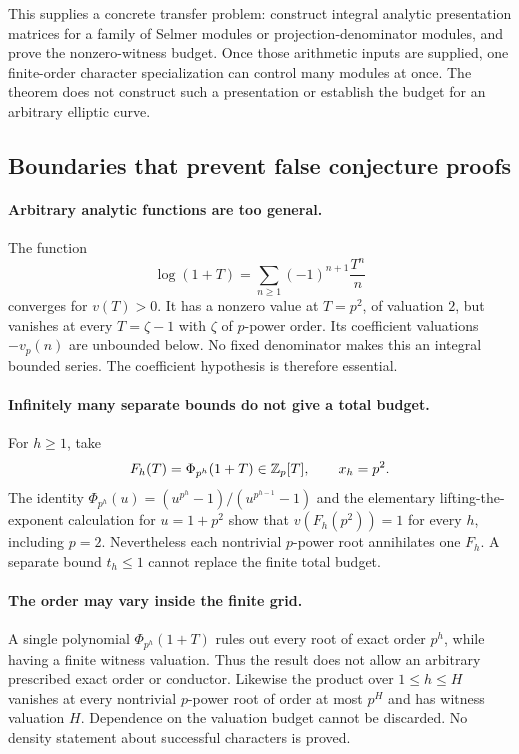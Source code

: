 This supplies a concrete transfer problem: construct integral analytic
presentation matrices for a family of Selmer modules or
projection-denominator modules, and prove the nonzero-witness budget.
Once those arithmetic inputs are supplied, one finite-order character
specialization can control many modules at once. The theorem does not
construct such a presentation or establish the budget for an arbitrary
elliptic curve.

\subsection{Boundaries that prevent false conjecture proofs}

\paragraph{Arbitrary analytic functions are too general.}
The function
\[
 \log(1+T)=\sum_{n\ge1}(-1)^{n+1}\frac{T^n}{n}
\]
converges for $v(T)>0$. It has a nonzero value at $T=p^2$, of
valuation $2$, but vanishes at every $T=\zeta-1$ with $\zeta$ of
$p$-power order. Its coefficient valuations $-v_p(n)$ are unbounded
below. No fixed denominator makes this an integral bounded series.
The coefficient hypothesis is therefore essential.

\paragraph{Infinitely many separate bounds do not give a total budget.}
For $h\ge1$, take
\[
 F_h(T)=\Phi_{p^h}(1+T)\in\mathbb Z_p[T],\qquad x_h=p^2.
\]
The identity
$\Phi_{p^h}(u)=(u^{p^h}-1)/(u^{p^{h-1}}-1)$ and the elementary
lifting-the-exponent calculation for $u=1+p^2$ show that
$v(F_h(p^2))=1$ for every $h$, including $p=2$.
Nevertheless each nontrivial $p$-power root annihilates one $F_h$.
A separate bound $t_h\le1$ cannot replace the finite total budget.

\paragraph{The order may vary inside the finite grid.}
A single polynomial $\Phi_{p^h}(1+T)$ rules out every root of exact
order $p^h$, while having a finite witness valuation. Thus the result
does not allow an arbitrary prescribed exact order or conductor.
Likewise the product over $1\le h\le H$ vanishes at every nontrivial
$p$-power root of order at most $p^H$ and has witness valuation $H$.
Dependence on the valuation budget cannot be discarded. No density
statement about successful characters is proved.

